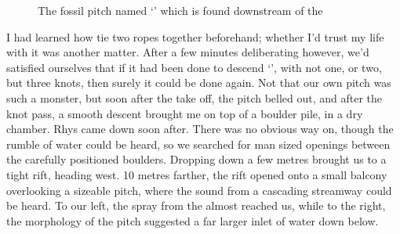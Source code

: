     \begin{figure}[h]
        \checkoddpage \ifoddpage \forcerectofloat \else \forceversofloat \fi
        \centering
        
        \caption{The fossil pitch named `\protect{}' which is found downstream of the \protect{} }
        \label{water chamber below helm's deep}
    \end{figure}

    I had learned how tie two ropes together beforehand; whether I'd trust my life with it was another matter. After a few minutes deliberating however, we'd satisfied ourselves that if it had been done to descend `', with not one, or two, but three knots, then surely it could be done again. Not that our own pitch was such a monster, but soon after the take off, the pitch belled out, and after the knot pass, a smooth descent brought me on top of a boulder pile, in a dry chamber. Rhys came down soon after. There was no obvious way on, though the rumble of water could be heard, so we searched for man sized openings between the carefully positioned boulders. Dropping down a few metres brought us to a tight rift, heading west. 10 metres farther, the rift opened onto a small balcony overlooking a sizeable pitch, where the sound from a cascading streamway could be heard. To our left, the spray from the  almost reached us, while to the right, the morphology of the pitch suggested a far larger inlet of water down below.



